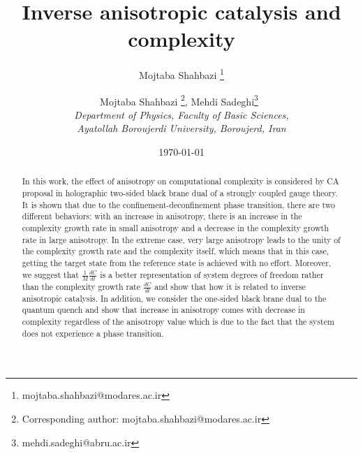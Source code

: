 \documentclass[]{article}
\begin{document}
\title{\textbf{Inverse anisotropic catalysis and complexity}}

\author{ Mojtaba Shahbazi \thanks{mojtaba.shahbazi@modares.ac.ir} }

\author{Mojtaba Shahbazi \thanks{Corresponding author: mojtaba.shahbazi@modares.ac.ir},  Mehdi Sadeghi\thanks{mehdi.sadeghi@abru.ac.ir}\,\,\, \hspace{2mm}\\
	{\small {\em Department of Physics, Faculty of Basic Sciences,}}\\
	{\small {\em Ayatollah Boroujerdi University, Boroujerd, Iran}}
}
\date{\today}
\maketitle


\maketitle
\begin{abstract}
In this work, the effect of anisotropy on computational complexity is considered by CA proposal in holographic two-sided black brane dual of a strongly coupled gauge theory. It is shown that due to the confinement-deconfinement phase transition, there are two different behaviors: with an increase in anisotropy, there is an increase in the complexity growth rate in small anisotropy and a decrease in the complexity growth rate in large anisotropy. In the extreme case, very large anisotropy leads to the unity of the complexity growth rate and the complexity itself, which means that in this case, getting the target state from the reference state is achieved with no effort. Moreover, we suggest that $\frac{1}{M}\frac{dC}{dt}$ is a better representation of system degrees of freedom rather than the complexity growth rate $\frac{dC}{dt}$ and show that how it is related to inverse anisotropic catalysis. In addition, we consider the one-sided black brane dual to the quantum quench and show that increase in anisotropy comes with decrease in complexity regardless of the anisotropy value which is due to the fact that the system does not experience a phase transition.
\end{abstract}

\end{document}
